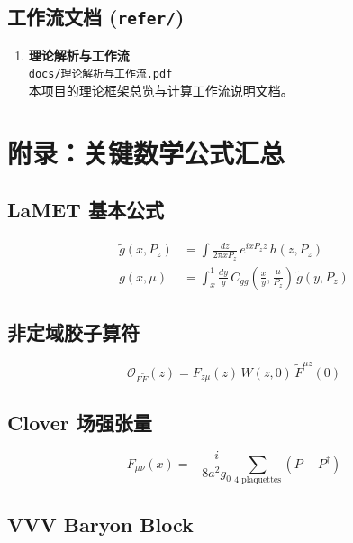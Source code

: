 \documentclass[12pt,a4paper]{ctexart}
\begin{document}
\subsection{工作流文档 (\texttt{refer/})}

\begin{enumerate}
    \item \textbf{理论解析与工作流} \\
    \texttt{docs/理论解析与工作流.pdf} \\
    本项目的理论框架总览与计算工作流说明文档。
\end{enumerate}

\section{附录：关键数学公式汇总}
\label{sec:appendix}

\subsection{LaMET 基本公式}

\begin{align}
    \tilde{g}(x, P_z) &= \int \frac{dz}{2\pi x P_z} \, e^{i x P_z z} \, h(z, P_z) \\
    g(x, \mu) &= \int_x^1 \frac{dy}{y} \, C_{gg}\left(\frac{x}{y}, \frac{\mu}{P_z}\right) \, \tilde{g}(y, P_z)
\end{align}

\subsection{非定域胶子算符}

\begin{equation}
\mathcal{O}_{F\tilde{F}}(z) = F_{z\mu}(z) \, W(z, 0) \, \tilde{F}^{\mu z}(0)
\end{equation}

\subsection{Clover 场强张量}

\begin{equation}
F_{\mu\nu}(x) = -\frac{i}{8a^2 g_0} \sum_{\text{4 plaquettes}} \left(P - P^\dagger\right)
\end{equation}

\subsection{VVV Baryon Block}
\end{document}
